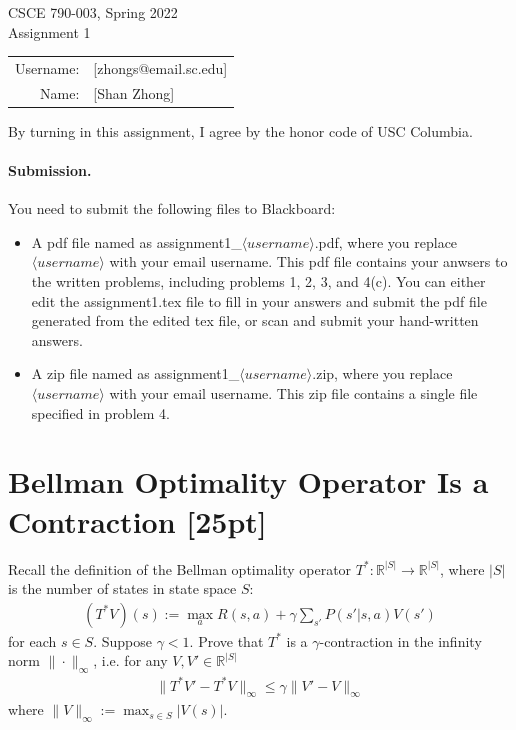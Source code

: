 \documentclass[11pt]{article}
\theoremstyle{case}
\newcommand{\norm}[2][2]{\| #2\|}
\begin{document}
\begin{center}
{\Large CSCE 790-003, Spring 2022 \\ Assignment 1}

\begin{tabular}{rl}
Username: & [zhongs@email.sc.edu] \\
Name: & [Shan Zhong] \\
\end{tabular}
\end{center}
By turning in this assignment, I agree by the honor code of USC Columbia.

\paragraph{Submission.}
You need to submit the following files to Blackboard:
\begin{itemize}
    \item A pdf file named as assignment1\_$\langle username \rangle$.pdf, where you replace $\langle username \rangle$ with your email username. This pdf file contains your anwsers to the written problems, including problems 1, 2, 3, and 4(c). 
    You can either edit the assignment1.tex file to fill in your answers and submit the pdf file generated from the edited tex file, or scan and submit your hand-written answers.
    \item A zip file named as assignment1\_$\langle username \rangle$.zip, where you replace $\langle username \rangle$ with your email username. This zip file contains a single file specified in problem 4.
\end{itemize}

\section{Bellman Optimality Operator Is a Contraction [25pt]}
Recall the definition of the Bellman optimality operator $T^*: \mathbb{R}^{|S|} \to \mathbb{R}^{|S|}$, where $|S|$ is the number of states in state space $S$:
\begin{align*}
    (T^*V)(s) := \max_a R(s,a) + \gamma \sum_{s'}P(s'|s,a)V(s')
\end{align*}
for each $s\in S$.
Suppose $\gamma<1$.
Prove that $T^*$ is a $\gamma$-contraction in the infinity norm $\norm{\cdot}_\infty$, i.e. for any $V, V'\in\mathbb{R}^{|S|}$
\begin{align*}
    \norm{T^*V'-T^*V}_\infty\leq\gamma\norm{V'-V}_\infty
\end{align*}
where $\norm{V}_\infty := \max_{s \in S} |V(s)| $.
\end{document}
